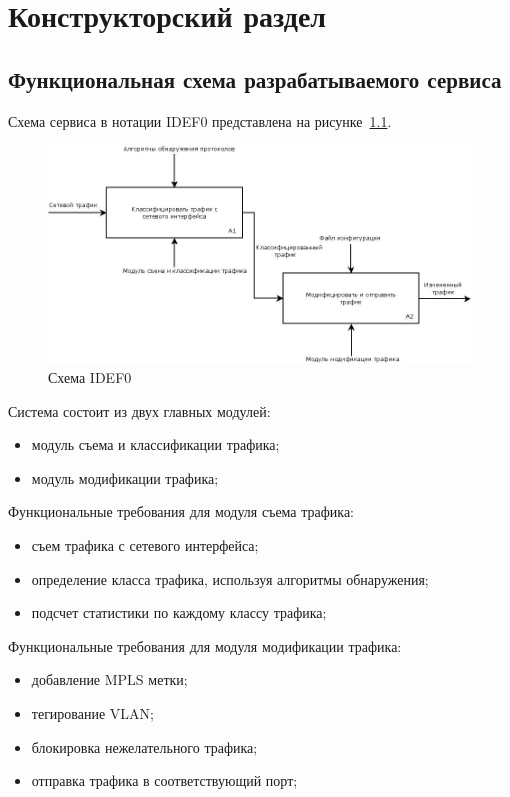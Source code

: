 \chapter{Конструкторский раздел}
\label{cha:design}
\section{Функциональная схема разрабатываемого сервиса}
Схема сервиса в нотации IDEF0 представлена на рисунке~\ref{pic:idef0_schema}.
\begin{figure}
\centering
\includegraphics[scale=0.5]{pictures/idef0_schema}
\caption{Схема IDEF0}
\label{pic:idef0_schema}
\end{figure}

Система состоит из двух главных модулей:
\begin{itemize}
\item модуль съема и классификации трафика;
\item модуль модификации трафика;
\end{itemize}

Функциональные требования для модуля съема трафика:
\begin{itemize}
\item съем трафика с сетевого интерфейса;
\item определение класса трафика, используя алгоритмы обнаружения;
\item подсчет статистики по каждому классу трафика;
\end{itemize}

Функциональные требования для модуля модификации трафика:
\begin{itemize}
\item добавление MPLS метки;
\item тегирование VLAN;
\item блокировка нежелательного трафика;
\item отправка трафика в соответствующий порт;
\end{itemize}


